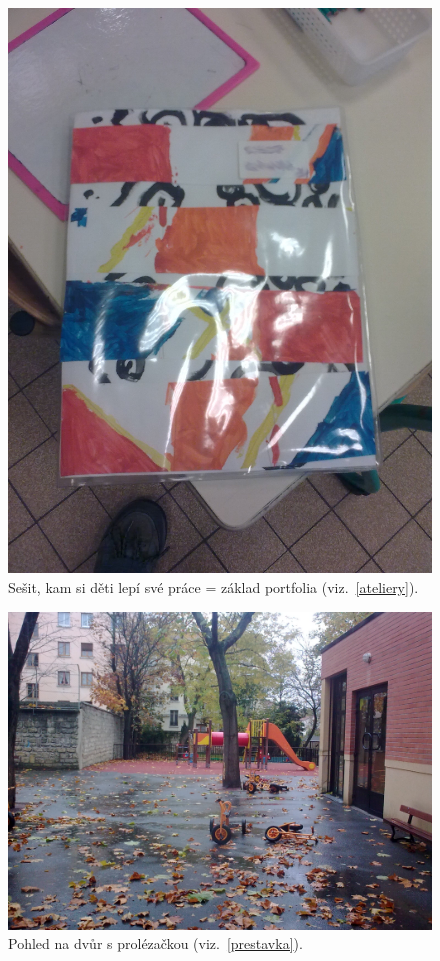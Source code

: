 	\begin{figure}[tb]
		\centering
		\includegraphics[height=0.35\textheight]{./fotky/Obr15.jpg}
		\caption{
			Sešit, kam si děti lepí své práce = základ portfolia (viz.~\ref{ateliery}).
		}
		\label{Obr15}
	\end{figure}

	\begin{figure}[tb]
		\centering
		\includegraphics[height=0.35\textheight]{./fotky/Obr16.jpg}
		\caption{
			Pohled na dvůr s prolézačkou (viz.~\ref{prestavka}).
		}
		\label{Obr16}
	\end{figure}

